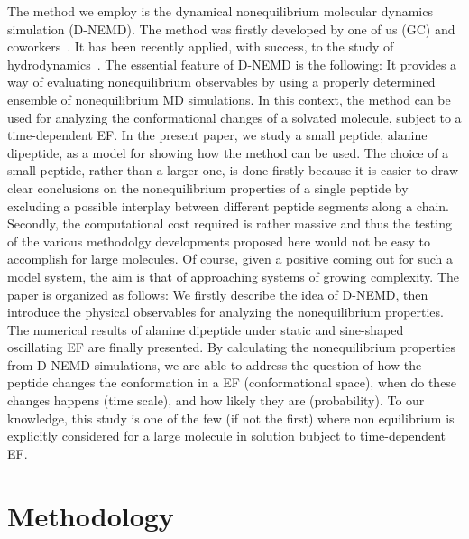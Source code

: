 \documentclass[a4paper,preprint,unsortedaddress,onecolumn]{revtex4-1}
\begin{document}
The method we employ is the dynamical nonequilibrium molecular dynamics simulation (D-NEMD).
The method was firstly developed by one of us (GC) and coworkers~\cite{ciccotti1975direct, ciccotti1979thought}.
It has been recently applied, with success, to the study of
hydrodynamics~\cite{orlandini2011hydrodynamics,
  orlandini2011hydrodynamics-01}. The essential feature of D-NEMD is the following: It provides a way of evaluating
nonequilibrium observables by using a properly determined ensemble of nonequilibrium MD
simulations.  In this context, the method can be used for analyzing the
conformational changes of a solvated molecule, subject to a time-dependent EF.
In the present paper, we study a small peptide, alanine dipeptide, as a model for showing how the method can be used. 
The choice of a small peptide, rather than a larger one, is done firstly because it
is easier to draw clear conclusions on the nonequilibrium properties
of a single peptide by excluding a possible interplay between
different peptide segments along a chain.
Secondly, the computational cost required is rather massive and thus the testing of the various methodolgy developments proposed here would not be easy to accomplish for large molecules. Of course, given a positive coming out for such a model system, the aim is that of approaching systems of growing complexity.
The paper is organized as follows:
We firstly describe the idea of D-NEMD, then
introduce the physical
observables for analyzing the nonequilibrium properties. The numerical results of alanine
dipeptide under static and sine-shaped oscillating EF are
finally presented. By calculating the nonequilibrium properties from D-NEMD
simulations, we are able to address the question of how the peptide
changes the conformation in a EF (conformational space), when do these changes happens (time scale),
and how likely they are (probability). 
To our knowledge, this study is one of the few (if not the first)  where non equilibrium is explicitly considered for a large molecule in solution bubject to time-dependent EF.



\section{Methodology}
\end{document}
